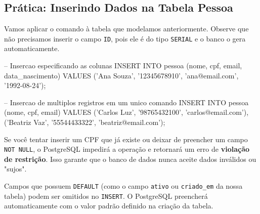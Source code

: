 \subsection{Prática: Inserindo Dados na Tabela Pessoa}

Vamos aplicar o comando à tabela que modelamos anteriormente. Observe que não precisamos inserir o campo \texttt{ID}, pois ele é do tipo \texttt{SERIAL} e o banco o gera automaticamente.

\begin{sqlcode}
-- Insercao especificando as colunas
INSERT INTO pessoa (nome, cpf, email, data_nascimento)
VALUES ('Ana Souza', '12345678910', 'ana@email.com', '1992-08-24');

-- Insercao de multiplos registros em um unico comando
INSERT INTO pessoa (nome, cpf, email)
VALUES 
    ('Carlos Luz', '98765432100', 'carlos@email.com'),
    ('Beatriz Vaz', '55544433322', 'beatriz@email.com');
\end{sqlcode}



\begin{tcolorbox}[colback=red!5,colframe=red!40!black,title=Atenção: Erros de Restrição]
Se você tentar inserir um CPF que já existe ou deixar de preencher um campo \texttt{NOT NULL}, o PostgreSQL impedirá a operação e retornará um erro de \textbf{violação de restrição}. Isso garante que o banco de dados nunca aceite dados inválidos ou "sujos".
\end{tcolorbox}

\begin{tcolorbox}[colback=blue!5,colframe=blue!40!black,title=Dica do Professor: Omissions]
Campos que possuem \texttt{DEFAULT} (como o campo \texttt{ativo} ou \texttt{criado\_em} da nossa tabela) podem ser omitidos no \texttt{INSERT}. O PostgreSQL preencherá automaticamente com o valor padrão definido na criação da tabela.
\end{tcolorbox}

\vspace{0.5cm}
\begin{center}

\end{center}




